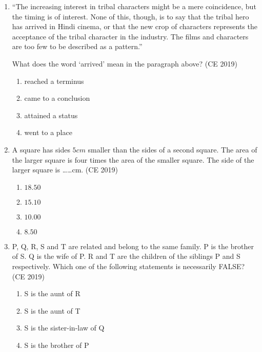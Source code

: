 \documentclass[journal]{IEEEtran}
\begin{document}
\begin{enumerate}
    \item ``The increasing interest in tribal characters might be a mere coincidence, but the timing is of interest. None of this, though, is to say that the tribal hero has arrived in Hindi cinema, or that the new crop of characters represents the acceptance of the tribal character in the industry. The films and characters are too few to be described as a pattern.''

    What does the word `arrived' mean in the paragraph above?  \hfill (CE 2019)

    \begin{multicols}{2}
        \begin{enumerate}
            \item reached a terminus
            \item came to a conclusion
            \item attained a status
            \item went to a place
        \end{enumerate}
    \end{multicols}

    \item A square has sides $5 cm$ smaller than the sides of a second square. The area of the larger square is four times the area of the smaller square. The side of the larger square is \ldots\ldots cm.  \hfill (CE 2019)

    \begin{multicols}{4}
        \begin{enumerate}
            \item $18.50$
            \item $15.10$
            \item $10.00$
            \item $8.50$
        \end{enumerate}
    \end{multicols}


    \item P, Q, R, S and T are related and belong to the same family. P is the brother of S. Q is the wife of P. R and T are the children of the siblings P and S respectively. Which one of the following statements is necessarily FALSE?  \hfill (CE 2019)
    
    \begin{multicols}{2}
        \begin{enumerate}
            \item S is the aunt of R
            \item S is the aunt of T
            \item S is the sister-in-law of Q
            \item S is the brother of P
        \end{enumerate}
    \end{multicols}
    

\end{enumerate}
\end{document}
